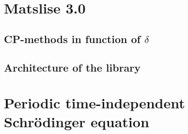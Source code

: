 \section{Matslise 3.0}

\cite{baeyens_fast_2020}

\subsection{CP-methods in function of \texorpdfstring{$\delta$}{delta}}

\subsection{Architecture of the \texorpdfstring{\cpp}{C++} library}

\section{Periodic \texorpdfstring{\oneD}{1D} time-independent Schrödinger equation}
\label{sec:1d_periodic}

\begin{theorem}

\end{theorem}
\cite{binding_prufer_2012}

\stopchapter
